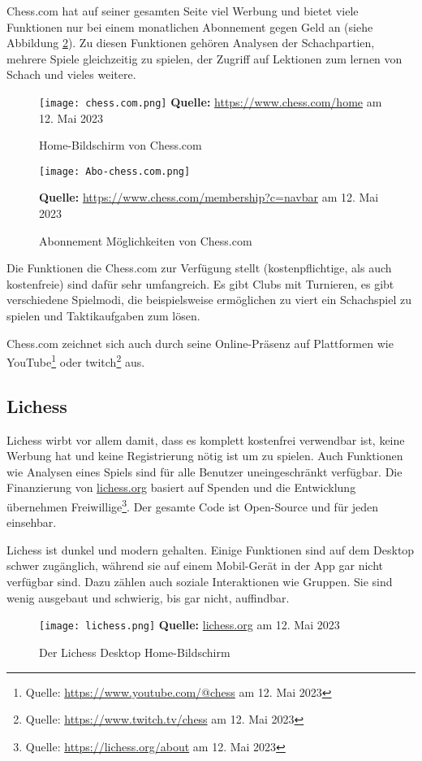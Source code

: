 Chess.com hat auf seiner gesamten Seite viel Werbung und bietet viele Funktionen nur bei einem monatlichen Abonnement gegen Geld an (siehe Abbildung \ref{fig:chess.com-abo}). Zu diesen Funktionen gehören Analysen der Schachpartien, mehrere Spiele gleichzeitig zu spielen, der Zugriff auf Lektionen zum lernen von Schach und vieles weitere.

  \begin{figure}[htb]
  \centering
  \texttt{[image: chess.com.png]}
\raggedleft
    \footnotesize\sffamily\textbf{Quelle:} \url{https://www.chess.com/home} am 12. Mai 2023
  \caption{Home-Bildschirm von Chess.com}
  \label{fig:chess.com}
\end{figure}

  \begin{figure}[htb]
  \centering
  \texttt{[image: Abo-chess.com.png]}
  
\raggedleft

    \footnotesize\sffamily\textbf{Quelle:} \url{https://www.chess.com/membership?c=navbar} am 12. Mai 2023
  \caption{Abonnement Möglichkeiten von Chess.com}
  \label{fig:chess.com-abo}
\end{figure}

Die Funktionen die Chess.com zur Verfügung stellt (kostenpflichtige, als auch kostenfreie) sind dafür sehr umfangreich. Es gibt Clubs mit Turnieren, es gibt verschiedene Spielmodi, die beispielsweise ermöglichen zu viert ein Schachspiel zu spielen und Taktikaufgaben zum lösen.

Chess.com zeichnet sich auch durch seine Online-Präsenz auf Plattformen wie YouTube\footnote{Quelle: \url{https://www.youtube.com/@chess} am 12. Mai 2023} oder twitch\footnote{Quelle: \url{https://www.twitch.tv/chess} am 12. Mai 2023} aus.


\subsection{Lichess}
Lichess wirbt vor allem damit, dass es komplett kostenfrei verwendbar ist, keine Werbung hat und keine Registrierung nötig ist um zu spielen. Auch Funktionen wie Analysen eines Spiels sind für alle Benutzer uneingeschränkt verfügbar. Die Finanzierung von \url{lichess.org} basiert auf Spenden und die Entwicklung übernehmen Freiwillige\footnote{Quelle: \url{https://lichess.org/about} am 12. Mai 2023}. Der gesamte Code ist Open-Source und für jeden einsehbar.

Lichess ist dunkel und modern gehalten. Einige Funktionen sind auf dem Desktop schwer zugänglich, während sie auf einem Mobil-Gerät in der App gar nicht verfügbar sind. Dazu zählen auch soziale Interaktionen wie Gruppen. Sie sind wenig ausgebaut und schwierig, bis gar nicht, auffindbar.

  \begin{figure}[htb]
  \centering
  \texttt{[image: lichess.png]}
\raggedleft
    \footnotesize\sffamily\textbf{Quelle:} \url{lichess.org} am 12. Mai 2023
  \caption{Der Lichess Desktop Home-Bildschirm}
  \label{fig:lichess}
\end{figure}